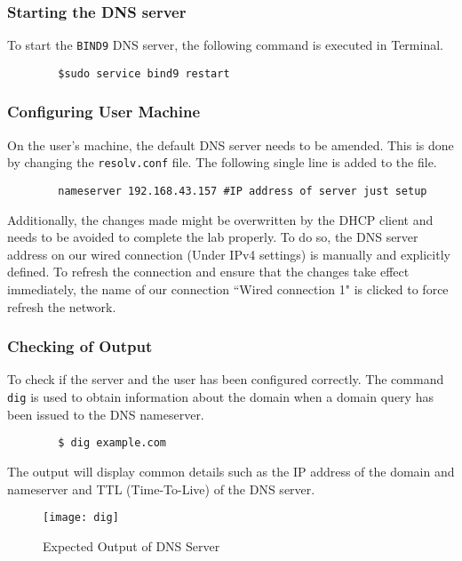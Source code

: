 \documentclass[a4paper,12pt]{article}
\begin{document}
		\subsubsection{Starting the DNS server}
		To start the \texttt{BIND9} DNS server, the following command is executed in Terminal.
		\begin{verbatim}
		$sudo service bind9 restart
		\end{verbatim}
		\subsubsection{Configuring User Machine}
		\begin{par}
		On the user's machine, the default DNS server needs to be amended. This is done by changing the \texttt{resolv.conf} file. The following single line is added to the file.\end{par} 
		\begin{verbatim}
		nameserver 192.168.43.157 #IP address of server just setup
		\end{verbatim}
		\begin{par}
		Additionally, the changes made might be overwritten by the DHCP client and needs to be avoided to complete the lab properly. To do so, the DNS server address on our wired connection (Under IPv4 settings) is manually and explicitly defined. To refresh the connection and ensure that the changes take effect immediately, the name of our connection ``Wired connection 1" is clicked to force refresh the network.
		\end{par}
		\subsubsection{Checking of Output}
		\begin{par}
		To check if the server and the user has been configured correctly. The command \texttt{dig} is used to obtain information about the domain when a domain query has been issued to the DNS nameserver.
		\begin{verbatim}
		$ dig example.com
		\end{verbatim}
		The output will display common details such as the IP address of the domain and nameserver and TTL (Time-To-Live) of the DNS server.
		
\begin{figure}[H]
\centering
\texttt{[image: dig]}
\caption{Expected Output of DNS Server}
\label{fig:dig}
\end{figure}
		\end{par}
		\newpage
\end{document}
